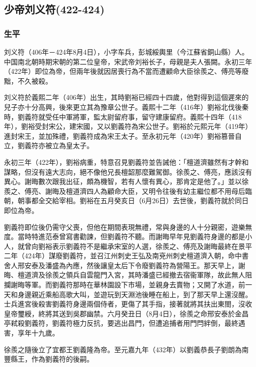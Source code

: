 
\subsection{少帝刘义符\tiny(422-424)}

\subsubsection{生平}

刘义符（406年－424年8月4日），小字车兵，彭城綏輿里（今江蘇省銅山縣）人。中国南北朝時期宋朝的第二位皇帝，宋武帝刘裕长子，母親是夫人張闕。永初三年（422年）即位為帝，但兩年後就因居喪行為不當而遭顧命大臣徐羨之、傅亮等廢黜，不久被殺。

刘义符於義熙二年（406年）出生，其時劉裕已經四十四歲，他對得到這個遲來的兒子亦十分高興，後來更立其為豫章公世子。義熙十二年（416年）劉裕北伐後秦時，劉義符就受任中軍將軍，監太尉留府事，留守建康留府。義熙十四年（418年），劉裕受封宋公，建宋國，又以劉義符為宋公世子。劉裕於元熙元年（419年）進封宋王，並加殊禮，劉義符成為宋王太子。至永初元年（420年）劉裕篡晉自立，劉義符亦被立為皇太子。

永初三年（422年），劉裕病重，特意召見劉義符並告誡他：「檀道濟雖然有才幹和謀略，但沒有遠大志向，絕不像他兄長檀韶那麼難駕御。徐羨之、傅亮，應該沒有異心。謝晦數次跟我出征，頗為機智，若有人懷有異心，那肯定是他了。」並以徐羨之、傅亮、謝晦及檀道濟四人為顧命大臣，又明令往後有幼主繼位都不用母后臨朝，朝事都全交給宰相。劉裕在五月癸亥日（6月26日）去世後，劉義符就於同日即位為帝。

劉義符即位後仍需守父喪，但他在期間表現無禮，常與身邊的人十分親密，遊樂無度。當時特進范泰曾寫書勸諫，但劉義符不聽。而謝晦早年見劉義符身邊的都是小人，就曾向劉裕表示劉義符不是繼承宋室的人選，徐羨之、傅亮及謝晦最終在景平二年（424年）謀廢劉義符，並召江州刺史王弘及南兗州刺史檀道濟入朝，命中書舍人邢安泰及潘盛為內應，然後讓皇太后下令廢劉義符為營陽王。那天早上，謝晦、檀道濟及徐羨之領兵自雲龍門入宮，其時潘盛已經撤去宿衞軍隊，故此無人阻攔謝晦等軍。而劉義符那時在華林園設下市場，並親身去賣物；又開了水道，前一天和身邊親近乘船高歌大叫，並遊玩到天淵池後睡在船上，到了那天早上還沒醒。士兵進宮後殺害劉義符身邊兩個侍者，更傷了其手指，接著就將其扶出東閤，沒收皇帝璽綬，終將其送到吳郡幽禁。六月癸丑日（8月4日），徐羨之命邢安泰於金昌亭弒殺劉義符，劉義符極力反抗，要逃出昌門，但遭追捕者用門閂絆倒，最終遇害，享年十九歲。

徐羨之隨後立了宜都王劉義隆為帝。至元嘉九年（432年）以劉義恭長子劉朗為南豐縣王，作為劉義符的後嗣。

